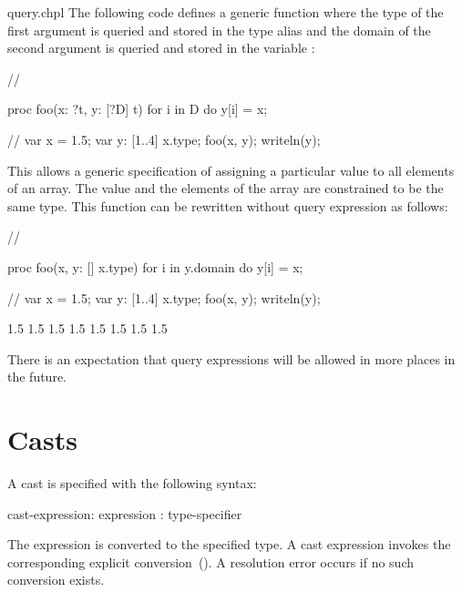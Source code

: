 \begin{chapelexample}{query.chpl}
The following code defines a generic function where the type of the
first argument is queried and stored in the type alias  and
the domain of the second argument is queried and stored in the
variable :
\begin{chapelnoprint}
{ // }
\end{chapelnoprint}
\begin{chapel}
proc foo(x: ?t, y: [?D] t) {
  for i in D do
    y[i] = x;
}
\end{chapel}
\begin{chapelnoprint}
// {
var x = 1.5;
var y: [1..4] x.type;
foo(x, y);
writeln(y);
}
\end{chapelnoprint}
This allows a generic specification of assigning a
particular value to all elements of an array.  The value and the
elements of the array are constrained to be the same type.  This
function can be rewritten without query expression as follows:
\begin{chapelnoprint}
{ // }
\end{chapelnoprint}
\begin{chapel}
proc foo(x, y: [] x.type) {
  for i in y.domain do
    y[i] = x;
}
\end{chapel}
\begin{chapelnoprint}
// {
var x = 1.5;
var y: [1..4] x.type;
foo(x, y);
writeln(y);
}
\end{chapelnoprint}
\begin{chapeloutput}
1.5 1.5 1.5 1.5
1.5 1.5 1.5 1.5
\end{chapeloutput}
\end{chapelexample}

There is an expectation that query expressions will be allowed in more
places in the future.

\section{Casts}
\label{Casts}

A cast is specified with the following syntax:
\begin{syntax}
cast-expression:
  expression : type-specifier
\end{syntax}
The expression is converted to the specified type.  A cast expression invokes
the corresponding explicit conversion~().  A
resolution error occurs if no such conversion exists.

